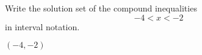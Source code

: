 

Write the solution set of the compound inequalities
\[-4< x <-2 \]
in interval notation.

\begin{solution}
$(-4, -2)$
\end{solution}